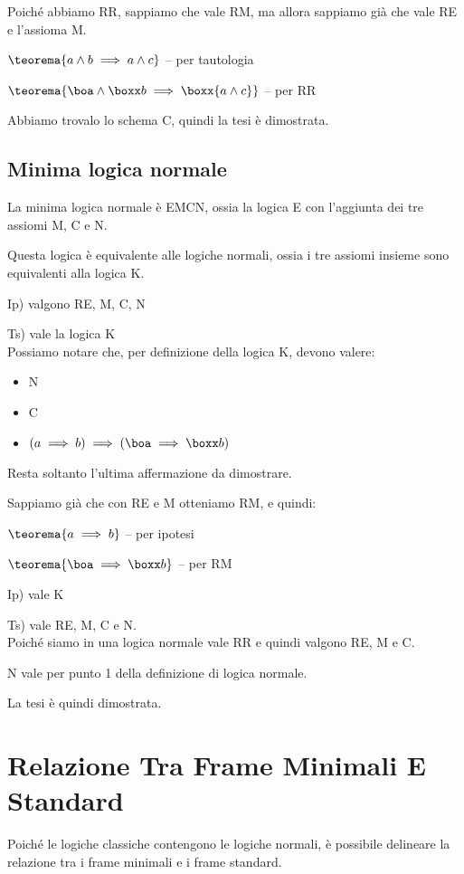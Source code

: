 Poiché abbiamo RR, sappiamo che vale RM, ma allora sappiamo già che
vale RE e l'assioma M.

$\teorema{a\wedge b\implies a\wedge c}$ -- per tautologia

$\teorema{\boa\wedge\boxx b\implies\boxx{a\wedge c}}$ -- per RR

Abbiamo trovalo lo schema C, quindi la tesi è dimostrata.


\subsection{Minima logica normale}

La minima logica normale è EMCN, ossia la logica E con l'aggiunta
dei tre assiomi M, C e N.

Questa logica è equivalente alle logiche normali, ossia i tre assiomi
insieme sono equivalenti alla logica K.

Ip) valgono RE, M, C, N

Ts) vale la logica K\\


Possiamo notare che, per definizione della logica K, devono valere:
\begin{itemize}
\item N 
\item C
\item $(a\implies b)\implies(\boa\implies\boxx b)$
\end{itemize}
Resta soltanto l'ultima affermazione da dimostrare.

Sappiamo già che con RE e M otteniamo RM, e quindi:

$\teorema{a\implies b}$ -- per ipotesi

$\teorema{\boa\implies\boxx b}$ -- per RM

Ip) vale K

Ts) vale RE, M, C e N.\\


Poiché siamo in una logica normale vale RR e quindi valgono RE, M
e C.

N vale per punto 1 della definizione di logica normale.

La tesi è quindi dimostrata.


\section{Relazione Tra Frame Minimali E Standard}

Poiché le logiche classiche contengono le logiche normali, è possibile
delineare la relazione tra i frame minimali e i frame standard.


